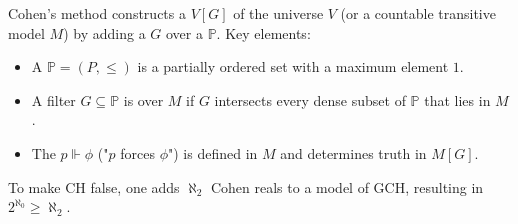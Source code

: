 Cohen's  method constructs a  $V[G]$ of the universe $V$ (or a countable transitive model $M$) by adding a  $G$ over a  $\mathbb{P}$. Key elements:
\begin{itemize}
\item A  $\mathbb{P} = (P, \leq)$ is a partially ordered set with a maximum element $1$.
\item A filter $G \subseteq \mathbb{P}$ is  over $M$ if $G$ intersects every dense subset of $\mathbb{P}$ that lies in $M$.
\item The  $p \Vdash \phi$ ("$p$ forces $\phi$") is defined in $M$ and determines truth in $M[G]$.
\end{itemize}
To make CH false, one adds $\aleph_2$ Cohen reals to a model of GCH, resulting in $2^{\aleph_0} \geq \aleph_2$.
